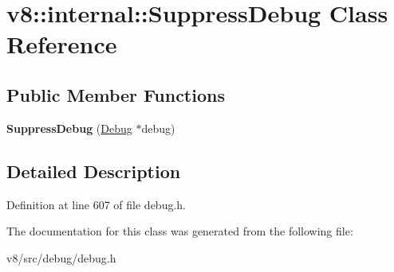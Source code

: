 \hypertarget{classv8_1_1internal_1_1SuppressDebug}{}\section{v8\+:\+:internal\+:\+:Suppress\+Debug Class Reference}
\label{classv8_1_1internal_1_1SuppressDebug}
\subsection*{Public Member Functions}
\begin{DoxyCompactItemize}
\item 
\mbox{\label{classv8_1_1internal_1_1SuppressDebug_aeca54b0f5de6ab89cf5817aa318cbf4a}} 
{\bfseries Suppress\+Debug} (\mbox{\hyperlink{classv8_1_1internal_1_1Debug}{Debug}} $\ast$debug)
\end{DoxyCompactItemize}


\subsection{Detailed Description}


Definition at line 607 of file debug.\+h.



The documentation for this class was generated from the following file\+:\begin{DoxyCompactItemize}
\item 
v8/src/debug/debug.\+h\end{DoxyCompactItemize}
